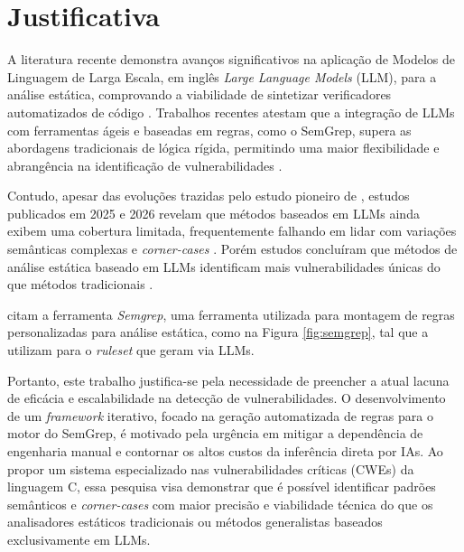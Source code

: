 \documentclass[
    12pt,                %
    openright,           %
    oneside,             %
    a4paper,             %
    english,             %
    brazil               %
]{abntex2}
\begin{document}
\section{Justificativa}
\label{sec:justificativa}
\par
A literatura recente demonstra avanços significativos na aplicação de Modelos de Linguagem de Larga Escala, em inglês \textit{Large Language Models} (LLM), para a análise estática, comprovando a viabilidade de sintetizar verificadores automatizados de código \cite{hou2025generation, yang2025knighter}.
Trabalhos recentes atestam que a integração de LLMs com ferramentas ágeis e baseadas em regras, como o SemGrep, supera as abordagens tradicionais de lógica rígida, permitindo uma maior flexibilidade e abrangência na identificação de vulnerabilidades \cite{hou2025generation, yang2025knighter, li2026llmbased}.
\par
Contudo, apesar das evoluções trazidas pelo estudo pioneiro de , estudos publicados em 2025 e 2026 revelam que métodos baseados em LLMs ainda exibem uma cobertura limitada, frequentemente falhando em lidar com variações semânticas complexas e \textit{corner-cases} \cite{hou2025generation, yang2025knighter}.
Porém estudos concluíram que métodos de análise estática baseado em LLMs identificam mais vulnerabilidades únicas do que métodos tradicionais \cite{yang2025knighter, hou2025generation, li2026llmbased}.
\par
{} citam a ferramenta \textit{Semgrep}, uma ferramenta utilizada para montagem de regras personalizadas para análise estática, como na Figura \ref{fig:semgrep}, tal que a utilizam para o \textit{ruleset} que geram via LLMs.
\par
Portanto, este trabalho justifica-se pela necessidade de preencher a atual lacuna de eficácia e escalabilidade na detecção de vulnerabilidades.
O desenvolvimento de um \textit{framework} iterativo, focado na geração automatizada de regras para o motor do SemGrep, é motivado pela urgência em mitigar a dependência de engenharia manual e contornar os altos custos da inferência direta por IAs.
Ao propor um sistema especializado nas vulnerabilidades críticas (CWEs) da linguagem C, essa pesquisa visa demonstrar que é possível identificar padrões semânticos e \textit{corner-cases} com maior precisão e viabilidade técnica do que os analisadores estáticos tradicionais ou métodos generalistas baseados exclusivamente em LLMs.
\end{document}
